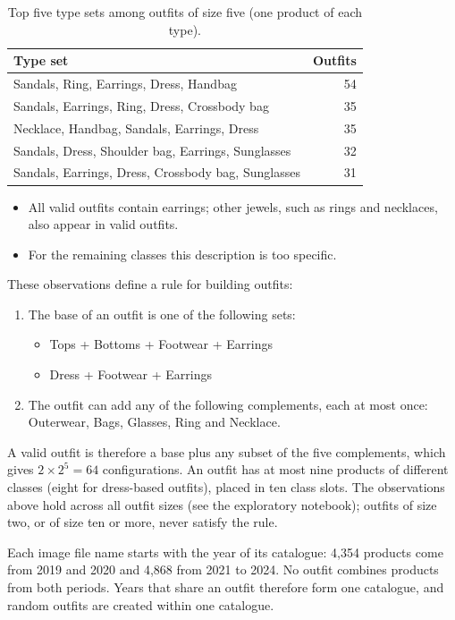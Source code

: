 \documentclass[10pt,a4paper,twocolumn]{article}
\begin{document}
\begin{table}[tb]
\centering\small
\begin{tabularx}{\columnwidth}{>{\raggedright\arraybackslash}Xr}
\toprule
Type set & Outfits \\
\midrule
Sandals, Ring, Earrings, Dress, Handbag & 54 \\
Sandals, Earrings, Ring, Dress, Crossbody bag & 35 \\
Necklace, Handbag, Sandals, Earrings, Dress & 35 \\
Sandals, Dress, Shoulder bag, Earrings, Sunglasses & 32 \\
Sandals, Earrings, Dress, Crossbody bag, Sunglasses & 31 \\
\bottomrule
\end{tabularx}
\caption{Top five type sets among outfits of size five (one product of each type).}
\label{tab:type}
\end{table}

\begin{itemize}
\item All valid outfits contain earrings; other jewels, such as rings and necklaces, also appear in valid outfits.
\item For the remaining classes this description is too specific.
\end{itemize}

These observations define a rule for building outfits:
\begin{enumerate}
\item The base of an outfit is one of the following sets:
  \begin{itemize}
  \item Tops + Bottoms + Footwear + Earrings
  \item Dress + Footwear + Earrings
  \end{itemize}
\item The outfit can add any of the following complements, each at most once: Outerwear, Bags, Glasses, Ring and Necklace.
\end{enumerate}

A valid outfit is therefore a base plus any subset of the five complements, which gives $2 \times 2^5 = 64$ configurations. An outfit has at most nine products of different classes (eight for dress-based outfits), placed in ten class slots. The observations above hold across all outfit sizes (see the exploratory notebook); outfits of size two, or of size ten or more, never satisfy the rule.

Each image file name starts with the year of its catalogue: 4,354 products come from 2019 and 2020 and 4,868 from 2021 to 2024. No outfit combines products from both periods. Years that share an outfit therefore form one catalogue, and random outfits are created within one catalogue.
\end{document}
